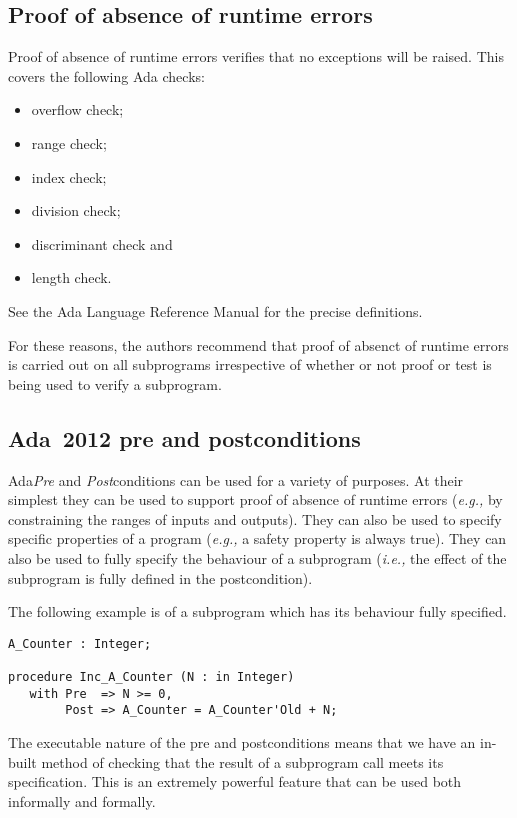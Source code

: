 \documentclass{llncs}
\newcommand{\ada}{Ada\xspace}
\newcommand{\adatwtw}{Ada~2012\xspace}
\newcommand{\ie}{\textit{i.e.,}\xspace}
\newcommand{\eg}{\textit{e.g.,}\xspace}
\begin{document}
\subsection{Proof of absence of runtime errors}

Proof of absence of runtime errors verifies that no exceptions will
be raised. This covers the following Ada checks:

\begin{itemize}
\item overflow check;
\item range check;
\item index check;
\item division check;
\item discriminant check and
\item length check.
\end{itemize}

See the Ada Language Reference Manual for the precise definitions.

For these reasons, the authors recommend that proof of absenct of
runtime errors is carried out on all subprograms irrespective of
whether or not proof or test is being used to verify a subprogram.

\subsection{\adatwtw pre and postconditions}

\ada \emph{Pre} and \emph{Post}conditions can be used for a variety
of purposes. At their simplest they can be used to support proof of
absence of runtime errors (\eg by constraining the ranges of inputs
and outputs). They can also be used to specify specific properties of
a program (\eg a safety property is always true). They can also be
used to fully specify the behaviour of a subprogram (\ie the effect of
the subprogram is fully defined in the postcondition).

The following example is of a subprogram which has its behaviour fully
specified.

\begin{lstlisting}[language=SPARK]
A_Counter : Integer;

procedure Inc_A_Counter (N : in Integer)
   with Pre  => N >= 0,
        Post => A_Counter = A_Counter'Old + N;
\end{lstlisting}

The executable nature of the pre and postconditions means that we have
an in-built method of checking that the result of a subprogram call
meets its specification. This is an extremely powerful feature that
can be used both informally and formally.
\end{document}
